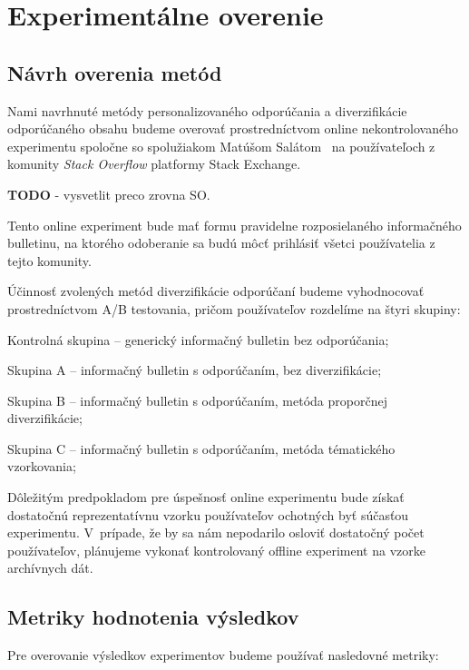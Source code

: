 \afterpage{\blankpage}
\newpage
\chapter{Experimentálne overenie}
\label{sec:experiment}

\section{Návrh overenia metód}

Nami navrhnuté metódy personalizovaného odporúčania a diverzifikácie odporúčaného obsahu budeme overovať prostredníctvom
online nekontrolovaného experimentu spoločne so spolužiakom Matúšom Salátom~\cite{Salat2018} na používateľoch z komunity \textit{Stack Overflow} platformy Stack Exchange.

\textbf{TODO} - vysvetlit preco zrovna SO.

Tento online experiment bude mať formu pravidelne rozposielaného informačného bulletinu, na ktorého odoberanie sa budú
môcť prihlásiť všetci používatelia z tejto komunity.

Účinnosť zvolených metód diverzifikácie odporúčaní budeme vyhodnocovať prostredníctvom A/B testovania, pričom používateľov
rozdelíme na štyri skupiny:
\begin{my_enumerate}
    \item{Kontrolná skupina -- generický informačný bulletin bez odporúčania;}
    \item{Skupina A -- informačný bulletin s odporúčaním, bez diverzifikácie;}
    \item{Skupina B -- informačný bulletin s odporúčaním, metóda proporčnej diverzifikácie;}
    \item{Skupina C -- informačný bulletin s odporúčaním, metóda tématického vzorkovania;}
\end{my_enumerate}

Dôležitým predpokladom pre úspešnosť online experimentu bude získať dostatočnú reprezentatívnu vzorku používateľov
ochotných byť súčasťou experimentu. V~prípade, že by sa nám nepodarilo osloviť dostatočný počet používateľov, plánujeme
vykonať kontrolovaný offline experiment na vzorke archívnych dát.


\section{Metriky hodnotenia výsledkov}

Pre overovanie výsledkov experimentov budeme používať nasledovné metriky:

